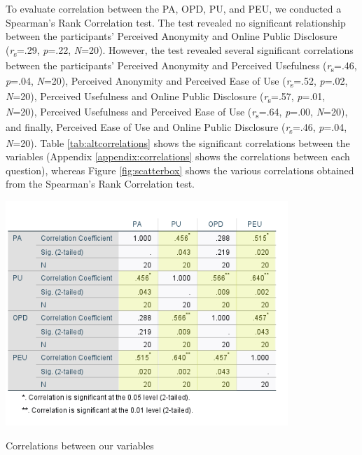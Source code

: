 To evaluate correlation between the PA, OPD, PU, and PEU, we conducted a Spearman's Rank Correlation test. The test revealed no significant relationship between the participants' Perceived Anonymity and Online Public Disclosure (\textit{r}\textsubscript{s}=.29, \textit{p}=.22, \textit{N}=20). However, the test revealed several significant correlations between the participants' Perceived Anonymity and Perceived Usefulness (\textit{r}\textsubscript{s}=.46, \textit{p}=.04, \textit{N}=20), Perceived Anonymity and Perceived Ease of Use (\textit{r}\textsubscript{s}=.52, \textit{p}=.02, \textit{N}=20), Perceived Usefulness and Online Public Disclosure (\textit{r}\textsubscript{s}=.57, \textit{p}=.01, \textit{N}=20), Perceived Usefulness and Perceived Ease of Use (\textit{r}\textsubscript{s}=.64, \textit{p}=.00, \textit{N}=20), and finally, Perceived Ease of Use and Online Public Disclosure (\textit{r}\textsubscript{s}=.46, \textit{p}=.04, \textit{N}=20). Table \ref{tab:altcorrelations} shows the significant correlations between the variables (Appendix \ref{appendix:correlations} shows the correlations between each question), whereas Figure \ref{fig:scatterbox} shows the various correlations obtained from the Spearman's Rank Correlation test.

\begin{table}[!htb]
\includegraphics[width=0.8\textwidth]{figures/altCorrelations.png}
\centering
\caption{Correlations between our variables}
\label{tab:altcorrelations}
\end{table}

